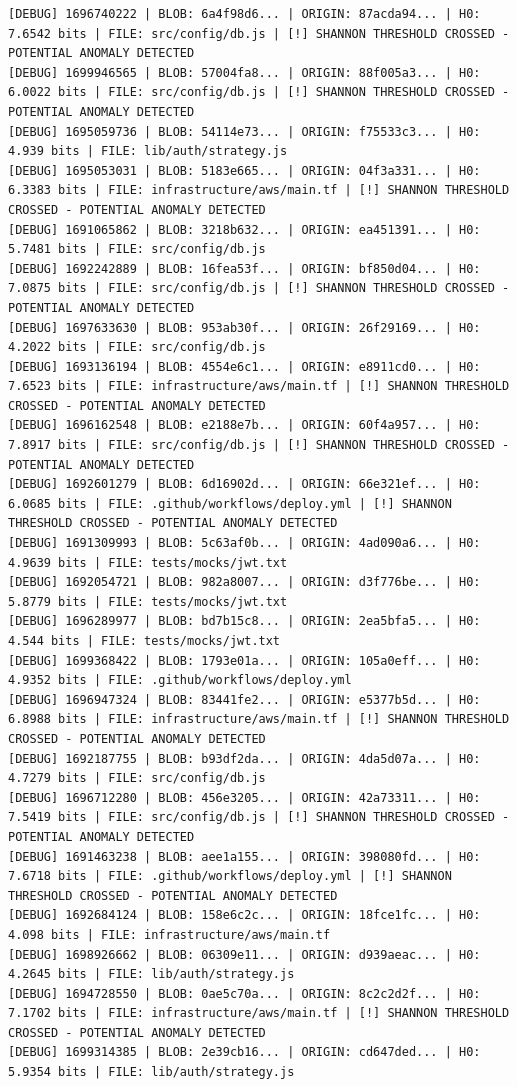 \documentclass[12pt, a4paper, oneside]{report}
\begin{document}
\begin{lstlisting}[basicstyle=\tiny\ttfamily]
[DEBUG] 1696740222 | BLOB: 6a4f98d6... | ORIGIN: 87acda94... | H0: 7.6542 bits | FILE: src/config/db.js | [!] SHANNON THRESHOLD CROSSED - POTENTIAL ANOMALY DETECTED
[DEBUG] 1699946565 | BLOB: 57004fa8... | ORIGIN: 88f005a3... | H0: 6.0022 bits | FILE: src/config/db.js | [!] SHANNON THRESHOLD CROSSED - POTENTIAL ANOMALY DETECTED
[DEBUG] 1695059736 | BLOB: 54114e73... | ORIGIN: f75533c3... | H0: 4.939 bits | FILE: lib/auth/strategy.js
[DEBUG] 1695053031 | BLOB: 5183e665... | ORIGIN: 04f3a331... | H0: 6.3383 bits | FILE: infrastructure/aws/main.tf | [!] SHANNON THRESHOLD CROSSED - POTENTIAL ANOMALY DETECTED
[DEBUG] 1691065862 | BLOB: 3218b632... | ORIGIN: ea451391... | H0: 5.7481 bits | FILE: src/config/db.js
[DEBUG] 1692242889 | BLOB: 16fea53f... | ORIGIN: bf850d04... | H0: 7.0875 bits | FILE: src/config/db.js | [!] SHANNON THRESHOLD CROSSED - POTENTIAL ANOMALY DETECTED
[DEBUG] 1697633630 | BLOB: 953ab30f... | ORIGIN: 26f29169... | H0: 4.2022 bits | FILE: src/config/db.js
[DEBUG] 1693136194 | BLOB: 4554e6c1... | ORIGIN: e8911cd0... | H0: 7.6523 bits | FILE: infrastructure/aws/main.tf | [!] SHANNON THRESHOLD CROSSED - POTENTIAL ANOMALY DETECTED
[DEBUG] 1696162548 | BLOB: e2188e7b... | ORIGIN: 60f4a957... | H0: 7.8917 bits | FILE: src/config/db.js | [!] SHANNON THRESHOLD CROSSED - POTENTIAL ANOMALY DETECTED
[DEBUG] 1692601279 | BLOB: 6d16902d... | ORIGIN: 66e321ef... | H0: 6.0685 bits | FILE: .github/workflows/deploy.yml | [!] SHANNON THRESHOLD CROSSED - POTENTIAL ANOMALY DETECTED
[DEBUG] 1691309993 | BLOB: 5c63af0b... | ORIGIN: 4ad090a6... | H0: 4.9639 bits | FILE: tests/mocks/jwt.txt
[DEBUG] 1692054721 | BLOB: 982a8007... | ORIGIN: d3f776be... | H0: 5.8779 bits | FILE: tests/mocks/jwt.txt
[DEBUG] 1696289977 | BLOB: bd7b15c8... | ORIGIN: 2ea5bfa5... | H0: 4.544 bits | FILE: tests/mocks/jwt.txt
[DEBUG] 1699368422 | BLOB: 1793e01a... | ORIGIN: 105a0eff... | H0: 4.9352 bits | FILE: .github/workflows/deploy.yml
[DEBUG] 1696947324 | BLOB: 83441fe2... | ORIGIN: e5377b5d... | H0: 6.8988 bits | FILE: infrastructure/aws/main.tf | [!] SHANNON THRESHOLD CROSSED - POTENTIAL ANOMALY DETECTED
[DEBUG] 1692187755 | BLOB: b93df2da... | ORIGIN: 4da5d07a... | H0: 4.7279 bits | FILE: src/config/db.js
[DEBUG] 1696712280 | BLOB: 456e3205... | ORIGIN: 42a73311... | H0: 7.5419 bits | FILE: src/config/db.js | [!] SHANNON THRESHOLD CROSSED - POTENTIAL ANOMALY DETECTED
[DEBUG] 1691463238 | BLOB: aee1a155... | ORIGIN: 398080fd... | H0: 7.6718 bits | FILE: .github/workflows/deploy.yml | [!] SHANNON THRESHOLD CROSSED - POTENTIAL ANOMALY DETECTED
[DEBUG] 1692684124 | BLOB: 158e6c2c... | ORIGIN: 18fce1fc... | H0: 4.098 bits | FILE: infrastructure/aws/main.tf
[DEBUG] 1698926662 | BLOB: 06309e11... | ORIGIN: d939aeac... | H0: 4.2645 bits | FILE: lib/auth/strategy.js
[DEBUG] 1694728550 | BLOB: 0ae5c70a... | ORIGIN: 8c2c2d2f... | H0: 7.1702 bits | FILE: infrastructure/aws/main.tf | [!] SHANNON THRESHOLD CROSSED - POTENTIAL ANOMALY DETECTED
[DEBUG] 1699314385 | BLOB: 2e39cb16... | ORIGIN: cd647ded... | H0: 5.9354 bits | FILE: lib/auth/strategy.js
\end{lstlisting}
\end{document}

